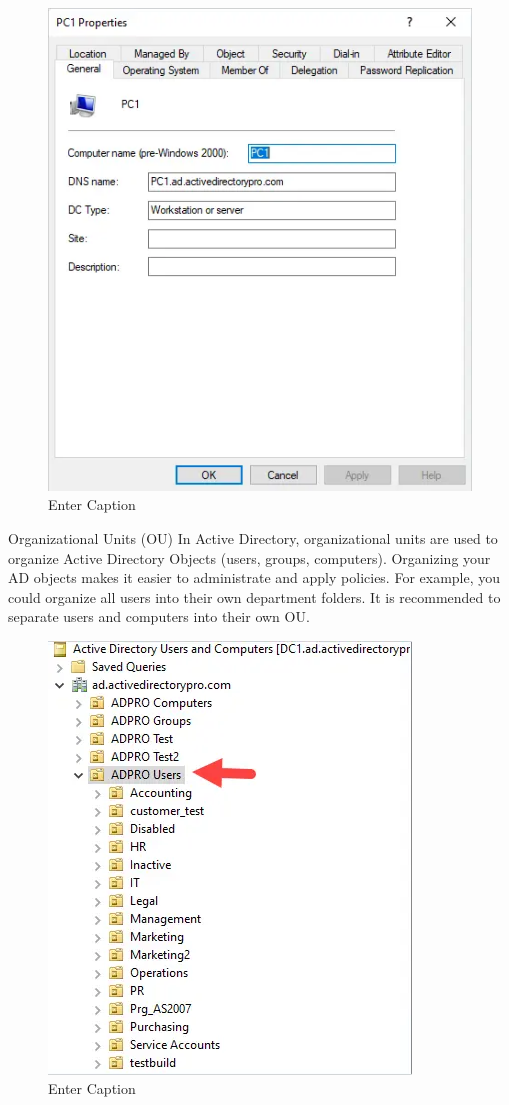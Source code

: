 \begin{figure}
    \centering
    \includegraphics[width=0.75\linewidth]{compobj.png}
    \caption{Enter Caption}
    \label{fig:placeholder}
\end{figure}

Organizational Units (OU)
In Active Directory, organizational units are used to organize Active Directory Objects (users, groups, computers). Organizing your AD objects makes it easier to administrate and apply policies. For example, you could organize all users into their own department folders. It is recommended to separate users and computers into their own OU.

\begin{figure}
    \centering
    \includegraphics[width=0.75\linewidth]{OU.png}
    \caption{Enter Caption}
    \label{fig:placeholder}
\end{figure}

